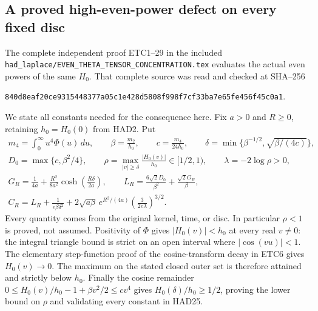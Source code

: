 \subsection{A proved high-even-power defect on every fixed disc}

The complete independent proof ETC1--29 in the included
\nolinkurl{had_laplace/EVEN_THETA_TENSOR_CONCENTRATION.tex}
evaluates the actual even powers of the same $H_0$.
That complete source was read and checked at SHA--256
\begin{center}\small
\nolinkurl{840d8eaf20ce9315448377a05c1e428d5808f998f7cf33ba7e65fe456f45c0a1}.
\end{center}
We state all constants needed for the consequence here.
Fix $a>0$ and $R\ge0$, retaining $h_0=H_0(0)$ from HAD2.
Put
\begin{equation}\tag{HAD25}
\begin{gathered}
 m_4=\int_0^\infty u^4\Phi(u)\,du,\qquad
 \beta=\frac{m_2}{h_0},\qquad c=\frac{m_4}{24h_0},\qquad
 \delta=\min\{\beta^{-1/2},\sqrt{\beta/(4c)}\},\\
 D_0=\max\{c,\beta^2/4\},\qquad
 \rho=\max_{|v|\ge\delta}\frac{|H_0(v)|}{h_0}\in[1/2,1),
 \qquad \lambda=-2\log\rho>0,\\
 G_R=\frac1{4a}+\frac{R^2}{8a^2}
                          \cosh\!\left(\frac{R\delta}{2a}\right),
 \qquad
 L_R=\frac{6\sqrt2D_0}{\beta^2}+\frac{\sqrt2G_R}{\beta},\\
 C_R=L_R+\frac1{e\beta\delta^2}
      +2\sqrt{a\beta}\,e^{R^2/(4a)}
                          \left(\frac3{2e\lambda}\right)^{3/2}.
\end{gathered}
\end{equation}
Every quantity comes from the original kernel, time, or disc.
In particular $\rho<1$ is proved, not assumed. Positivity
of $\Phi$ gives $|H_0(v)|<h_0$ at every real $v\ne0$:
the integral triangle bound is strict on an open interval
where $|\cos(vu)|<1$. The elementary step-function proof
of the cosine-transform decay in ETC6 gives $H_0(v)\to0$.
The maximum on the stated closed outer set is therefore
attained and strictly below $h_0$. Finally the cosine
remainder
$0\le H_0(v)/h_0-1+\beta v^2/2\le cv^4$
gives $H_0(\delta)/h_0\ge1/2$, proving the lower bound
on $\rho$ and validating every constant in HAD25.


